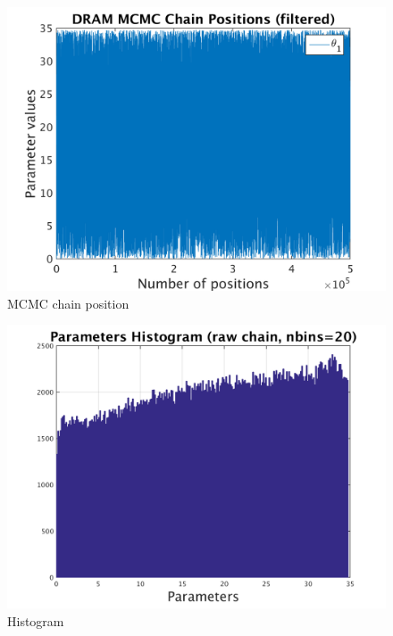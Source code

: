 \begin{figure}[h!]
  
  \centering
   \includegraphics[scale=0.75]{output_100/simple_ip_chain_pos_filt}
   \caption{MCMC chain position }
\end{figure}
%
%
\begin{figure}[h!]
  
  \centering
   \includegraphics[scale=0.75]{output_100/simple_ip_hist_raw}
   \caption{Histogram}
\end{figure}
%
%
%
